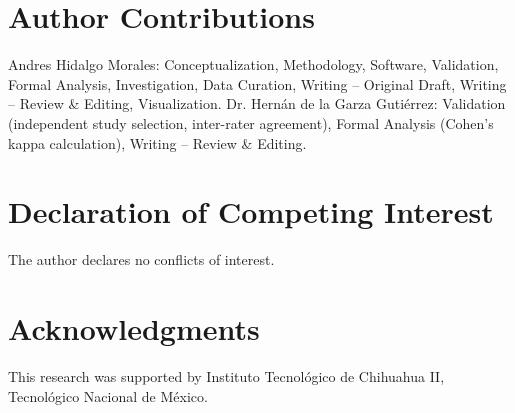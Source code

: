 \documentclass[review,3p,times]{elsarticle}
\begin{document}
\section*{Author Contributions}
Andres Hidalgo Morales: Conceptualization, Methodology, Software, Validation, Formal Analysis, Investigation, Data Curation, Writing -- Original Draft, Writing -- Review \& Editing, Visualization.
Dr. Hernán de la Garza Gutiérrez: Validation (independent study selection, inter-rater agreement), Formal Analysis (Cohen's kappa calculation), Writing -- Review \& Editing.

\section*{Declaration of Competing Interest}
The author declares no conflicts of interest.

\section*{Acknowledgments}
This research was supported by Instituto Tecnológico de Chihuahua II, Tecnológico Nacional de México.



\end{document}
